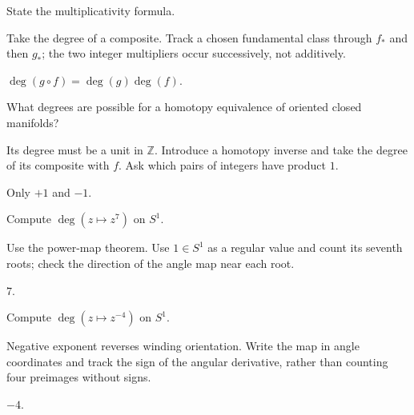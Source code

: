 \begin{exercise}\label{exr:viii03-07}
State the multiplicativity formula.
\end{exercise}
\begin{hint}Take the degree of a composite.
Track a chosen fundamental class through \(f_*\) and then \(g_*\); the two integer multipliers occur successively, not additively.
\end{hint}
\begin{solution}
\(\deg(g\circ f)=\deg(g)\deg(f)\).
\end{solution}

\begin{exercise}\label{exr:viii03-08}
What degrees are possible for a homotopy equivalence of oriented closed manifolds?
\end{exercise}
\begin{hint}Its degree must be a unit in \(\mathbb Z\).
Introduce a homotopy inverse and take the degree of its composite with \(f\). Ask which pairs of integers have product \(1\).
\end{hint}
\begin{solution}
Only \(+1\) and \(-1\).
\end{solution}

\begin{exercise}\label{exr:viii03-09}
Compute \(\deg(z\mapsto z^7)\) on \(S^1\).
\end{exercise}
\begin{hint}Use the power-map theorem.
Use \(1\in S^1\) as a regular value and count its seventh roots; check the direction of the angle map near each root.
\end{hint}
\begin{solution}
\(7\).
\end{solution}

\begin{exercise}\label{exr:viii03-10}
Compute \(\deg(z\mapsto z^{-4})\) on \(S^1\).
\end{exercise}
\begin{hint}Negative exponent reverses winding orientation.
Write the map in angle coordinates and track the sign of the angular derivative, rather than counting four preimages without signs.
\end{hint}
\begin{solution}
\(-4\).
\end{solution}

